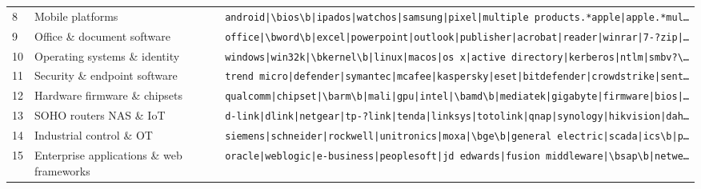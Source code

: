 \begin{longtable}{p{}p{}p{}}
8 & Mobile platforms & \texttt{android|\allowbreak{}\textbackslash{}bios\textbackslash{}b|\allowbreak{}ipados|\allowbreak{}watchos|\allowbreak{}samsung|\allowbreak{}pixel|\allowbreak{}multiple products.*apple|\allowbreak{}apple.*mul\ldots} \\
9 & Office \& document software & \texttt{office|\allowbreak{}\textbackslash{}bword\textbackslash{}b|\allowbreak{}excel|\allowbreak{}powerpoint|\allowbreak{}outlook|\allowbreak{}publisher|\allowbreak{}acrobat|\allowbreak{}reader|\allowbreak{}winrar|\allowbreak{}7-?zip|\allowbreak{}\ldots} \\
10 & Operating systems \& identity & \texttt{windows|\allowbreak{}win32k|\allowbreak{}\textbackslash{}bkernel\textbackslash{}b|\allowbreak{}linux|\allowbreak{}macos|\allowbreak{}os x|\allowbreak{}active directory|\allowbreak{}kerberos|\allowbreak{}ntlm|\allowbreak{}smbv?\textbackslash{}\ldots} \\
11 & Security \& endpoint software & \texttt{trend micro|\allowbreak{}defender|\allowbreak{}symantec|\allowbreak{}mcafee|\allowbreak{}kaspersky|\allowbreak{}eset|\allowbreak{}bitdefender|\allowbreak{}crowdstrike|\allowbreak{}sent\ldots} \\
12 & Hardware firmware \& chipsets & \texttt{qualcomm|\allowbreak{}chipset|\allowbreak{}\textbackslash{}barm\textbackslash{}b|\allowbreak{}mali|\allowbreak{}gpu|\allowbreak{}intel|\allowbreak{}\textbackslash{}bamd\textbackslash{}b|\allowbreak{}mediatek|\allowbreak{}gigabyte|\allowbreak{}firmware|\allowbreak{}bios|\allowbreak{}\ldots} \\
13 & SOHO routers NAS \& IoT & \texttt{d-link|\allowbreak{}dlink|\allowbreak{}netgear|\allowbreak{}tp-?link|\allowbreak{}tenda|\allowbreak{}linksys|\allowbreak{}totolink|\allowbreak{}qnap|\allowbreak{}synology|\allowbreak{}hikvision|\allowbreak{}dah\ldots} \\
14 & Industrial control \& OT & \texttt{siemens|\allowbreak{}schneider|\allowbreak{}rockwell|\allowbreak{}unitronics|\allowbreak{}moxa|\allowbreak{}\textbackslash{}bge\textbackslash{}b|\allowbreak{}general electric|\allowbreak{}scada|\allowbreak{}ics\textbackslash{}b|\allowbreak{}p\ldots} \\
15 & Enterprise applications \& web frameworks & \texttt{oracle|\allowbreak{}weblogic|\allowbreak{}e-business|\allowbreak{}peoplesoft|\allowbreak{}jd edwards|\allowbreak{}fusion middleware|\allowbreak{}\textbackslash{}bsap\textbackslash{}b|\allowbreak{}netwe\ldots} \\
\end{longtable}